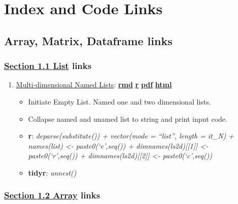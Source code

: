 \documentclass[
]{book}
\providecommand{\tightlist}{%
  \setlength{\itemsep}{0pt}\setlength{\parskip}{0pt}}
\begin{document}
\hypertarget{index-and-code-links}{%
\chapter{Index and Code Links}\label{index-and-code-links}}

\hypertarget{array-matrix-dataframe-links}{%
\section{Array, Matrix, Dataframe links}\label{array-matrix-dataframe-links}}

\hypertarget{section-1.1-listlist-links}{%
\subsection{\texorpdfstring{\protect\hyperlink{list}{Section 1.1 List} links}{Section 1.1 List links}}\label{section-1.1-listlist-links}}

\begin{enumerate}
\def\labelenumi{\arabic{enumi}.}
\tightlist
\item
  \href{https://fanwangecon.github.io/R4Econ/amto/list/htmlpdfr/fs_lst_basics.html}{Multi-dimensional Named Lists}: \href{https://github.com/FanWangEcon/R4Econ/blob/master/amto/list//fs_lst_basics.Rmd}{\textbf{rmd}} \textbar{} \href{https://github.com/FanWangEcon/R4Econ/blob/master/amto/list/htmlpdfr/fs_lst_basics.R}{\textbf{r}} \textbar{} \href{https://github.com/FanWangEcon/R4Econ/blob/master/amto/list/htmlpdfr/fs_lst_basics.pdf}{\textbf{pdf}} \textbar{} \href{https://fanwangecon.github.io/R4Econ/amto/list/htmlpdfr/fs_lst_basics.html}{\textbf{html}}

  \begin{itemize}
  \tightlist
  \item
    Initiate Empty List. Named one and two dimensional lists.
  \item
    Collapse named and unamed list to string and print input code.
  \item
    \textbf{r}: \emph{deparse(substitute()) + vector(mode = ``list'', length = it\_N) + names(list) \textless- paste0(`e',seq()) + dimnames(ls2d){[}{[}1{]}{]} \textless- paste0(`r',seq()) + dimnames(ls2d){[}{[}2{]}{]} \textless- paste0(`c',seq())}
  \item
    \textbf{tidyr}: \emph{unnest()}
  \end{itemize}
\end{enumerate}

\hypertarget{section-1.2-arrayarray-links}{%
\subsection{\texorpdfstring{\protect\hyperlink{array}{Section 1.2 Array} links}{Section 1.2 Array links}}\label{section-1.2-arrayarray-links}}
\end{document}
